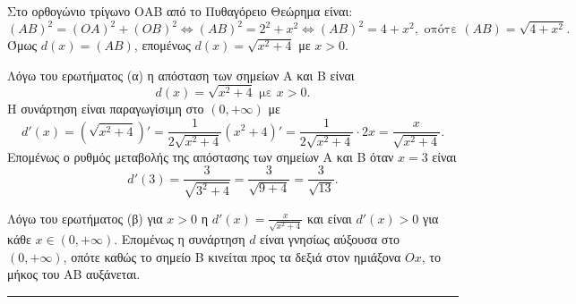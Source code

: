 \begin{alist}
    \item Στο ορθογώνιο τρίγωνο ΟΑΒ από το Πυθαγόρειο Θεώρημα είναι:
    \[(ΑΒ)^2 = (ΟΑ)^2 + (ΟΒ)^2 \Leftrightarrow (ΑΒ)^2 = 2^2 + x^2 \Leftrightarrow (ΑΒ)^2 = 4 + x^2, \text{ οπότε } (ΑΒ) = \sqrt{4+x^2}.\]
    Όμως $d(x) = (ΑΒ)$, επομένως $d(x) = \sqrt{x^2+4}$ με $x>0$.

    \item Λόγω του ερωτήματος (α) η απόσταση των σημείων Α και Β είναι
    \[d(x) = \sqrt{x^2+4} \text{ με } x>0.\]
    Η συνάρτηση είναι παραγωγίσιμη στο $(0, +\infty)$ με
    \[d'(x) = (\sqrt{x^2+4})' = \frac{1}{2\sqrt{x^2+4}}(x^2+4)' = \frac{1}{2\sqrt{x^2+4}} \cdot 2x = \frac{x}{\sqrt{x^2+4}}.\]
    Επομένως ο ρυθμός μεταβολής της απόστασης των σημείων Α και Β όταν $x=3$ είναι
    \[d'(3) = \frac{3}{\sqrt{3^2+4}} = \frac{3}{\sqrt{9+4}} = \frac{3}{\sqrt{13}}.\]

    \item Λόγω του ερωτήματος (β) για $x>0$ η $d'(x) = \frac{x}{\sqrt{x^2+4}}$ και είναι $d'(x)>0$ για κάθε $x \in (0, +\infty)$. Επομένως η συνάρτηση $d$ είναι γνησίως αύξουσα στο $(0, +\infty)$, οπότε καθώς το σημείο Β κινείται προς τα δεξιά στον ημιάξονα $Ox$, το μήκος του ΑΒ αυξάνεται.
\end{alist}
\vspace{6mm}
\noindent\rule{\textwidth}{0.4pt}
\vspace{6mm}

